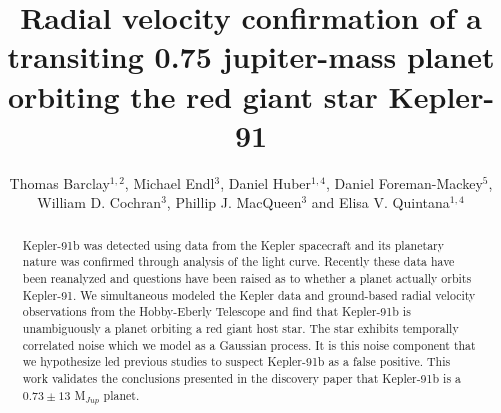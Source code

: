 \documentclass[apjl]{emulateapj}
\begin{document}
\title{Radial velocity confirmation of a transiting 0.75 jupiter-mass planet orbiting the red giant star Kepler-91}
\author{Thomas Barclay$^{1,2}$, Michael Endl$^{3}$, Daniel Huber$^{1,4}$,  Daniel Foreman-Mackey$^{5}$, William D. Cochran$^{3}$, Phillip J. MacQueen$^{3}$ and Elisa V. Quintana$^{1,4}$}




\begin{abstract}
Kepler-91b was detected using data from the Kepler spacecraft and its planetary nature was confirmed through analysis of the light curve. Recently these data have been reanalyzed and questions have been raised as to whether a planet actually orbits Kepler-91. We simultaneous modeled the Kepler data and ground-based radial velocity observations from the Hobby-Eberly Telescope and find that Kepler-91b is unambiguously a planet orbiting a red giant host star. The star exhibits temporally correlated noise which we model as a Gaussian process. It is this noise component that we hypothesize led previous studies to suspect Kepler-91b as a false positive. This work validates the conclusions presented in the discovery paper that Kepler-91b is a $0.73\pm 13$ M$_{Jup}$ planet.
\end{abstract}

\end{document}
